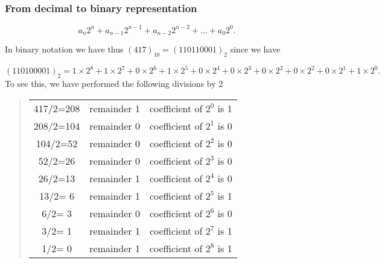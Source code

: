 \documentclass[handout]{beamer}
\newenvironment{block_mdfboxadmon}[1][]{\begin{block}{#1}}{\end{block}}
\begin{document}
\begin{frame}
\frametitle{From decimal to binary representation}

\begin{block_mdfboxadmon}[How to do it.]
\[
  a_n2^n+a_{n-1}2^{n-1}  +a_{n-2}2^{n-2}  +\dots +a_{0}2^{0}.
\]

In binary notation we have thus $(417)_{10} =(110110001)_2$
since we have

\[
(110100001)_2
=1\times2^8+1\times 2^{7}+0\times 2^{6}+1\times 2^{5}+0\times 2^{4}+0\times 2^{3}+0\times 2^{2}+0\times 2^{2}+0\times 2^{1}+1\times 2^{0}.
\]
To see this, we have performed the following divisions by 2




\begin{quote}
\begin{tabular}{ccc}
\hline
 \\
\hline
417/2=208                   & remainder 1                 & coefficient of $2^{0}$ is 1 \\
208/2=104                   & remainder 0                 & coefficient of $2^{1}$ is 0 \\
104/2=52                    & remainder 0                 & coefficient of $2^{2}$ is 0 \\
52/2=26                     & remainder 0                 & coefficient of $2^{3}$ is 0 \\
26/2=13                     & remainder 1                 & coefficient of $2^{4}$ is 0 \\
13/2= 6                     & remainder 1                 & coefficient of $2^{5}$ is 1 \\
6/2= 3                      & remainder 0                 & coefficient of $2^{6}$ is 0 \\
3/2= 1                      & remainder 1                 & coefficient of $2^{7}$ is 1 \\
1/2= 0                      & remainder 1                 & coefficient of $2^{8}$ is 1 \\
\hline
\end{tabular}
\end{quote}

\noindent
\end{block_mdfboxadmon}
\end{frame}
\end{document}
